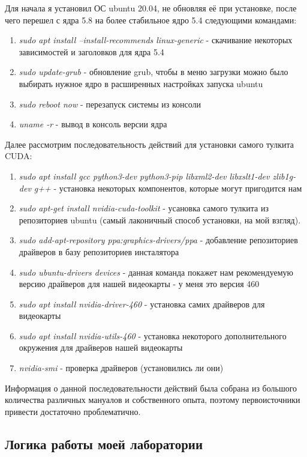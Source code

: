 \documentclass[12pt,a4paper]{scrartcl}
\begin{document}
Для начала я установил  ОС  ubuntu 20.04, не обновляя её при установке, после чего перешел с ядра 5.8 на более стабильное ядро 5.4 следующими командами:

\begin{enumerate}
	\item \textit{sudo apt install --install-recommends linux-generic} - скачивание некоторых зависимостей и заголовков для ядра 5.4
	\item \textit{sudo update-grub} - обновление grub, чтобы в меню загрузки можно было выбирать нужное ядро в расширенных настройках запуска ubuntu
	\item \textit{sudo reboot now} - перезапуск системы из консоли
	\item \textit{uname -r} - вывод в консоль версии ядра
\end{enumerate}


Далее рассмотрим последовательность действий для установки самого тулкита CUDA:

\begin{enumerate}
	\item \textit{sudo apt install gcc python3-dev python3-pip libxml2-dev libxslt1-dev zlib1g-dev g++} - установка некоторых компонентов, которые могут пригодится нам
	\item \textit{sudo apt-get install nvidia-cuda-toolkit} - усановка самого тулкита из репозиториев ubuntu (самый лаконичный способ установки, на мой взгляд).
	\item \textit{sudo add-apt-repository ppa:graphics-drivers/ppa} - добавление репозиториев драйверов в базу репозиториев инсталятора
	\item \textit{sudo ubuntu-drivers devices} - данная команда покажет нам рекомендуемую версию драйверов для нашей видеокарты - у меня это версия 460
	\item \textit{sudo apt install nvidia-driver-460} - установка самих драйверов для видеокарты
	\item \textit{sudo apt install nvidia-utils-460} - установка некоторого дополнительного окружения для драйверов нашей видеокарты
	\item \textit{nvidia-smi} - проверка драйверов (установились ли они)
\end{enumerate}

Информация о данной последовательности действий была собрана из большого количества различных мануалов и собственного опыта, поэтому первоисточники привести достаточно проблематично.

\subsection{Логика работы моей лаборатории}
\end{document}
